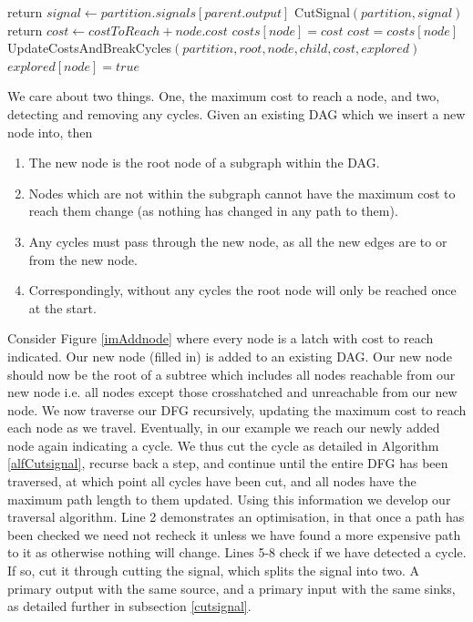 \documentclass[12pt,final,oneside]{dwThesis} %
\begin{document}
\begin{algorithm}
\begin{algorithmic}[1]
         \State return
         \EndIf
          
         \State $signal \gets partition.signals[parent.output]$ 
         \State CutSignal$(partition, signal)$
         \State return
         \EndIf
         \State $cost \gets costToReach+node.cost$
         \State $costs[node] = cost$
         \Else
         \State $cost = costs[node]$
         \EndIf
         \State UpdateCostsAndBreakCycles$(partition, root, node, child, cost, explored)$
         \EndFor
         \State $explored[node] = true$
         \EndProcedure
      \end{algorithmic}
   \end{algorithm}
   We care about two things. One, the maximum cost to reach a node, and two, detecting and removing any cycles.
   Given an existing \gls{DAG} which we insert a new node into, then
   \begin{enumerate}
      \item The new node is the root node of a subgraph within the \gls{DAG}.
      \item Nodes which are not within the subgraph cannot have the maximum cost to reach them change (as nothing has changed in any path to them).
      \item Any cycles must pass through the new node, as all the new edges are to or from the new node.
      \item Correspondingly, without any cycles the root node will only be reached once at the start.
   \end{enumerate}
   Consider Figure \ref{imAddnode} where every node is a latch with cost to reach indicated. Our new node (filled in) is added to an existing \gls{DAG}. Our new node should now be the root of a subtree which includes all nodes reachable from our new node i.e. all nodes except those crosshatched and unreachable from our new node.
   We now traverse our \gls{DFG} recursively, updating the maximum cost to reach each node as we travel. Eventually, in our example we reach our newly added node again indicating a cycle. We thus cut the cycle as detailed in Algorithm \ref{alfCutsignal}, recurse back a step, and continue until the entire \gls{DFG} has been traversed, at which point all cycles have been cut, and all nodes have the maximum path length to them updated.
   Using this information we develop our traversal algorithm.
   Line 2 demonstrates an optimisation, in that once a path has been checked we need not recheck it unless we have found a more expensive path to it as otherwise nothing will change.
   Lines 5-8 check if we have detected a cycle. If so, cut it through cutting the signal, which splits the signal into two. A primary output with the same source, and a primary input with the same sinks, as detailed further in subsection \ref{cutsignal}.
\end{document}
